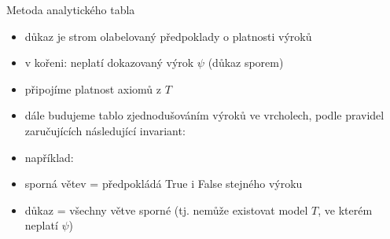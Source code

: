 \documentclass{beamer}
\begin{document}
\begin{frame}{Metoda analytického tabla}

\begin{itemize}
    \item důkaz je strom olabelovaný předpoklady o platnosti výroků
    \item v kořeni: \alert{neplatí} dokazovaný výrok $\psi$ (důkaz sporem)
    \item připojíme platnost axiomů z $T$
    \item dále budujeme tablo zjednodušováním výroků ve vrcholech, podle pravidel zaručujících následující \alert{invariant}:\medskip
    
    
    \vspace{-6pt}
    \item například:\medskip
        
    \vspace{-6pt}
    \item \alert{sporná} větev = předpokládá True i False stejného výroku
    \item \alert{důkaz} = všechny větve sporné (tj. nemůže existovat model $T$, ve kterém neplatí $\psi$)
\end{itemize}

\end{frame}
\end{document}
